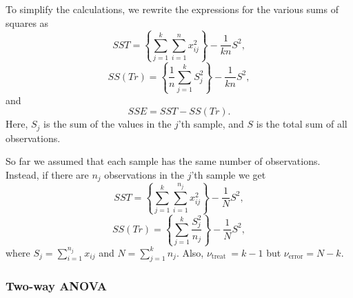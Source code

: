 To simplify the calculations, we rewrite the expressions for the various sums of squares as
\begin{equation}
SST = \left \{ \sum^k_{j=1} \sum^n_{i=1} x^2_{ij} \right \} - \frac{1}{kn} S^2,
\end{equation}
\begin{equation}
SS(Tr) = \left \{ \frac{1}{n}  \sum^k_{j=1} S^2_j \right \} - \frac{1}{kn} S^2,
\end{equation}
and
\begin{equation}
SSE = SST - SS(Tr).
\end{equation}
Here, $S_j$ is the sum of the values in the $j$'th sample, and $S$  is the total sum of all observations.

	So far we assumed that each sample has the same number of observations.  Instead, if there are $n_j$ 
observations in the $j$'th sample we get
\begin{equation}
SST = \left \{ \sum^k_{j=1} \sum^{n_j}_{i=1} x^2_{ij} \right \} - \frac{1}{N} S^2,
\end{equation}
\begin{equation}
SS(Tr) = \left \{ \sum^k_{j=1} \frac{S^2_j}{n_j} \right \} - \frac{1}{N} S^2,
\end{equation}
where $\displaystyle S_j = \sum^{n_j}_{i=1} x_{ij}$ and $\displaystyle N = \sum^k_{j=1} n_j$.
Also, $\nu_{\mbox{treat}} \ = k-1$ but $\nu_{\mbox{error}} = N-k$.

\subsubsection{Two-way ANOVA}

